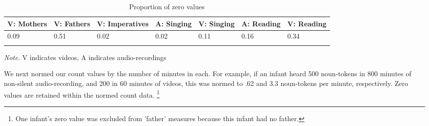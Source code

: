 \documentclass[floatsintext,man]{apa6}
\theoremstyle{definition}
\theoremstyle{definition}
\theoremstyle{definition}
\theoremstyle{remark}
\begin{document}
\begin{table}[tbp]
\begin{center}
\begin{threeparttable}
\caption{\label{tab:propna-missing-tables}Proportion of zero values}
\small{
\begin{tabular}{lllllll}
\toprule
V: Mothers & \multicolumn{1}{c}{V: Fathers} & \multicolumn{1}{c}{V: Imperatives} & \multicolumn{1}{c}{A: Singing} & \multicolumn{1}{c}{V: Singing} & \multicolumn{1}{c}{A: Reading} & \multicolumn{1}{c}{V: Reading}\\
\midrule
0.09 & 0.51 & 0.02 & 0.02 & 0.11 & 0.16 & 0.34\\
\bottomrule
\addlinespace
\end{tabular}
}
\begin{tablenotes}[para]
\textit{Note.} V indicates videos, A indicates audio-recordings
\end{tablenotes}
\end{threeparttable}
\end{center}
\end{table}

We next normed our count values by the number of minutes in each. For
example, if an infant heard 500 noun-tokens in 800 minutes of non-silent
audio-recording, and 200 in 60 minutes of videos, this was normed to .62
and 3.3 noun-tokens per minute, respectively. Zero values are retained
within the normed count data.
\footnote{One infant's zero value was excluded from 'father' measures because this infant had no father.}
\end{document}

